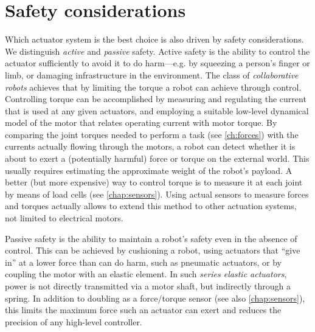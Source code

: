 
\section{Safety considerations}\label{sec:actuators:safety}
Which actuator system is the best choice is also driven by safety considerations. We distinguish \textsl{active} and \textsl{passive} safety. Active safety is the ability to control the actuator sufficiently to avoid it to do harm---e.g. by squeezing a person's finger or limb, or damaging infrastructure in the environment. The class of \textsl{collaborative robots} achieves that by limiting the torque a robot can achieve through control. %
Controlling torque can be accomplished by measuring and regulating the current that is used at any given actuators, and employing a suitable low-level dynamical model of the motor that relates operating current with motor torque. By comparing the joint torques needed to perform a task (see \cref{ch:forces}) with the currents actually flowing through the motors, a robot can detect whether it is about to exert a (potentially harmful) force or torque on the external world.
This usually requires estimating the approximate weight of the robot's payload. A better (but more expensive) way to control torque is to measure it at each joint by means of load cells (see \cref{chap:sensors}). Using actual sensors to measure forces and torques actually allows to extend this method to other actuation systems, not limited to electrical motors.

Passive safety is the ability to maintain a robot's safety even in the absence of control. This can be achieved by cushioning a robot, using actuators that ``give in'' at a lower force than can do harm, such as pneumatic actuators, or by coupling the motor with an elastic element. In such \textsl{series elastic actuators}, power is not directly transmitted via a motor shaft, but indirectly through a spring. In addition to doubling as a force/torque sensor (see also \cref{chap:sensors}), this limits the maximum force such an actuator can exert and reduces the precision of any high-level controller.

